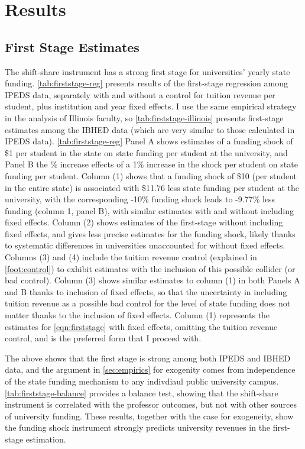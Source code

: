 \section{Results}
\label{sec:results}

\subsection{First Stage Estimates}
The shift-share instrument has a strong first stage for universities' yearly state funding.
\autoref{tab:firststage-reg} presents results of the first-stage regression among IPEDS data, separately with and without a control for tuition revenue per student, plus institution and year fixed effects.
I use the same empirical strategy in the analysis of Illinois faculty, so  \autoref{tab:firststage-illinois} presents first-stage estimates among the IBHED data (which are very similar to those calculated in IPEDS data).
\autoref{tab:firststage-reg} Panel A shows estimates of a funding shock of \$1 per student in the state on state funding per student at the university, and Panel B the \% increase effects of a 1\% increase in the shock per student on state funding per student.
Column (1) shows that a funding shock of \$10 (per student in the entire state) is associated with \$11.76 less state funding per student at the university, with the corresponding -10\% funding shock leads to -9.77\%
less funding (column 1, panel B), with similar estimates with and without including fixed effects.
Column (2) shows estimates of the first-stage without including fixed effects, and gives less precise estimates for the funding shock, likely thanks to systematic differences in universities unaccounted for without fixed effects.
Columns (3) and (4) include the tuition revenue control (explained in \autoref{foot:control}) to exhibit estimates with the inclusion of this possible collider (or bad control).
Column (3) shows similar estimates to column (1) in both Panels A and B thanks to inclusion of fixed effects, so that the uncertainty in including tuition revenue as a possible bad control for the level of state funding does not matter thanks to the inclusion of fixed effects.
Column (1) represents the estimates for \autoref{eqn:firststage} with fixed effects, omitting the tuition revenue control, and is the preferred form that I proceed with.

The above shows that the first stage is strong among both IPEDS and IBHED data, and the argument in \autoref{sec:empirics} for exogenity comes from independence of the state funding mechanism to any indivdiaul public university campus.
\autoref{tab:firststage-balance} provides a balance test, showing that the shift-share instrument is correlated with the professor outcomes, but not with other sources of university funding.
These results, together with the case for exogeneity, show the funding shock instrument
strongly predicts university revenues in the first-stage estimation.

